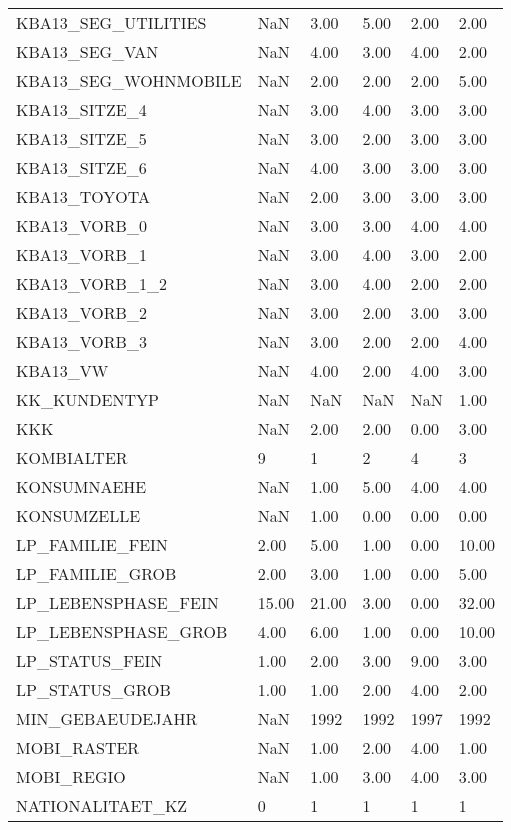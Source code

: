 \begin{longtable}{lp{1cm}p{1cm}p{1cm}p{1cm}p{1cm}}
KBA13\_SEG\_UTILITIES  & NaN & 3.00 & 5.00 & 2.00 & 2.00 \\
KBA13\_SEG\_VAN    & NaN & 4.00 & 3.00 & 4.00 & 2.00 \\
KBA13\_SEG\_WOHNMOBILE & NaN & 2.00 & 2.00 & 2.00 & 5.00 \\
KBA13\_SITZE\_4    & NaN & 3.00 & 4.00 & 3.00 & 3.00 \\
KBA13\_SITZE\_5    & NaN & 3.00 & 2.00 & 3.00 & 3.00 \\
KBA13\_SITZE\_6    & NaN & 4.00 & 3.00 & 3.00 & 3.00 \\
KBA13\_TOYOTA  & NaN & 2.00 & 3.00 & 3.00 & 3.00 \\
KBA13\_VORB\_0  & NaN & 3.00 & 3.00 & 4.00 & 4.00 \\
KBA13\_VORB\_1  & NaN & 3.00 & 4.00 & 3.00 & 2.00 \\
KBA13\_VORB\_1\_2   & NaN & 3.00 & 4.00 & 2.00 & 2.00 \\
KBA13\_VORB\_2  & NaN & 3.00 & 2.00 & 3.00 & 3.00 \\
KBA13\_VORB\_3  & NaN & 3.00 & 2.00 & 2.00 & 4.00 \\
KBA13\_VW & NaN & 4.00 & 2.00 & 4.00 & 3.00 \\
KK\_KUNDENTYP  & NaN & NaN & NaN & NaN & 1.00 \\
KKK  & NaN & 2.00 & 2.00 & 0.00 & 3.00 \\
KOMBIALTER & 9 & 1 & 2 & 4 & 3 \\
KONSUMNAEHE & NaN & 1.00 & 5.00 & 4.00 & 4.00 \\
KONSUMZELLE & NaN & 1.00 & 0.00 & 0.00 & 0.00 \\
LP\_FAMILIE\_FEIN  &   2.00 & 5.00 & 1.00 & 0.00 &  10.00 \\
LP\_FAMILIE\_GROB  &   2.00 & 3.00 & 1.00 & 0.00 & 5.00 \\
LP\_LEBENSPHASE\_FEIN  &  15.00 &  21.00 & 3.00 & 0.00 &  32.00 \\
LP\_LEBENSPHASE\_GROB  &   4.00 & 6.00 & 1.00 & 0.00 &  10.00 \\
LP\_STATUS\_FEIN   &   1.00 & 2.00 & 3.00 & 9.00 & 3.00 \\
LP\_STATUS\_GROB   &   1.00 & 1.00 & 2.00 & 4.00 & 2.00 \\
MIN\_GEBAEUDEJAHR & NaN & 1992 & 1992 & 1997 & 1992 \\
MOBI\_RASTER & NaN & 1.00 & 2.00 & 4.00 & 1.00 \\
MOBI\_REGIO & NaN & 1.00 & 3.00 & 4.00 & 3.00 \\
NATIONALITAET\_KZ   & 0 & 1 & 1 & 1 & 1 \\

\end{longtable}
